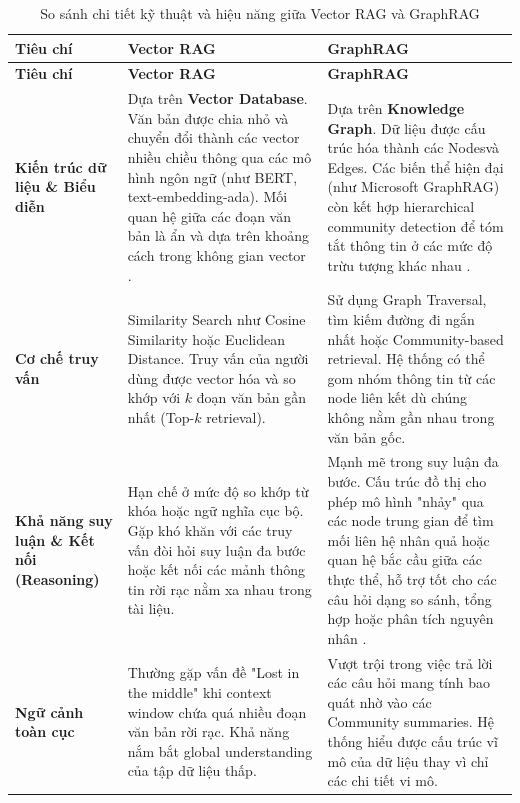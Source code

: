 \begin{longtable}{|>{\raggedright\arraybackslash}p{3cm}|>{\raggedright\arraybackslash}p{6cm}|>{\raggedright\arraybackslash}p{6cm}|}
\caption{So sánh chi tiết kỹ thuật và hiệu năng giữa Vector RAG và GraphRAG}
\label{tab:detailed_comparison} \\
\hline
\textbf{Tiêu chí} & \textbf{Vector RAG} & \textbf{GraphRAG} \\
\hline
\endfirsthead

\hline
\textbf{Tiêu chí} & \textbf{Vector RAG} & \textbf{GraphRAG} \\
\hline
\endhead

\hline
\endfoot

\hline
\endlastfoot

\textbf{Kiến trúc dữ liệu \& Biểu diễn} & 
Dựa trên \textbf{Vector Database}. Văn bản được chia nhỏ và chuyển đổi thành các vector nhiều chiều thông qua các mô hình ngôn ngữ (như BERT, text-embedding-ada). Mối quan hệ giữa các đoạn văn bản là ẩn và dựa trên khoảng cách trong không gian vector \cite{gao2023retrieval}. 
& 
Dựa trên \textbf{Knowledge Graph}. Dữ liệu được cấu trúc hóa thành các Nodesvà Edges. Các biến thể hiện đại (như Microsoft GraphRAG) còn kết hợp hierarchical community detection để tóm tắt thông tin ở các mức độ trừu tượng khác nhau \cite{edge2024graphrag}. \\ \hline

\textbf{Cơ chế truy vấn} & 
Similarity Search như Cosine Similarity hoặc Euclidean Distance. Truy vấn của người dùng được vector hóa và so khớp với $k$ đoạn văn bản gần nhất (Top-$k$ retrieval). 
& 
Sử dụng Graph Traversal, tìm kiếm đường đi ngắn nhất hoặc Community-based retrieval. Hệ thống có thể gom nhóm thông tin từ các node liên kết dù chúng không nằm gần nhau trong văn bản gốc. \\ \hline

\textbf{Khả năng suy luận \& Kết nối (Reasoning)} & 
Hạn chế ở mức độ so khớp từ khóa hoặc ngữ nghĩa cục bộ. Gặp khó khăn với các truy vấn đòi hỏi suy luận đa bước hoặc kết nối các mảnh thông tin rời rạc nằm xa nhau trong tài liệu. 
& 
Mạnh mẽ trong suy luận đa bước. Cấu trúc đồ thị cho phép mô hình "nhảy" qua các node trung gian để tìm mối liên hệ nhân quả hoặc quan hệ bắc cầu giữa các thực thể, hỗ trợ tốt cho các câu hỏi dạng so sánh, tổng hợp hoặc phân tích nguyên nhân \cite{pan2024unifying}. \\ \hline

\textbf{Ngữ cảnh toàn cục} & 
Thường gặp vấn đề "Lost in the middle" khi context window chứa quá nhiều đoạn văn bản rời rạc. Khả năng nắm bắt global understanding của tập dữ liệu thấp. 
& 
Vượt trội trong việc trả lời các câu hỏi mang tính bao quát nhờ vào các Community summaries. Hệ thống hiểu được cấu trúc vĩ mô của dữ liệu thay vì chỉ các chi tiết vi mô. \\ \hline


\end{longtable}
